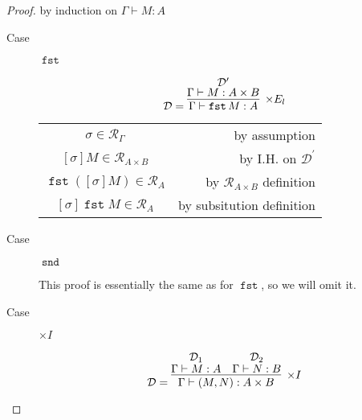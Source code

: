 \documentclass[letterpaper,11pt]{article}
\newcommand{\R}{\mathcal{R}}
\newcommand{\proves}{\vdash}
\DeclareMathOperator{\fst}{\mathtt{fst}}
\DeclareMathOperator{\snd}{\mathtt{snd}}
\begin{document}
\begin{proof} by induction on $\Gamma \proves M : A$

    \begin{description}
        \item[Case] $\fst{}$

            \begin{equation*}
                \mathcal{D} = \infer[\times E_l]{\Gamma \proves \fst M : A}{
                    \deduce[\mathcal{D}^\prime]{\Gamma \proves M : A \times B}{}
                }
            \end{equation*}

            \begin{center}
                \begin{tabular}{c r}
                    $\sigma \in \R_\Gamma$ &
                    by assumption \\
                    $[\sigma]M \in \R_{A \times B}$ &
                    by I.H. on $\mathcal{D}^\prime$ \\
                    $\fst{([\sigma]M)} \in \R_A$ &
                    by $\R_{A \times B}$ definition \\
                    $[\sigma]\fst M \in \R_A$ &
                    by subsitution definition
                \end{tabular}
            \end{center}

        \item[Case] $\snd{}$

            This proof is essentially the same as for $\fst{}$, so we will omit
            it.

        \item[Case] $\times I$

            \begin{equation*}
                \mathcal{D} =
                \infer[\times I]{\Gamma \proves (M, N) : A \times B}{
                    \deduce[\mathcal{D}_1]{\Gamma \proves M : A}{}
                    &
                    \deduce[\mathcal{D}_2]{\Gamma \proves N : B}{}
                }
            \end{equation*}


\end{description}
\end{proof}
\end{document}
